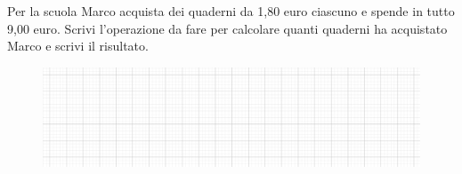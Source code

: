 \item Per la scuola Marco acquista dei quaderni da 1,80 euro ciascuno e spende in tutto 9,00 euro. Scrivi l'operazione da fare per calcolare quanti quaderni ha acquistato Marco e scrivi il risultato.
\begin{figure}[h]
	\centering
		\includegraphics[width=13cm]{figure/quadretti.png}
\end{figure}
